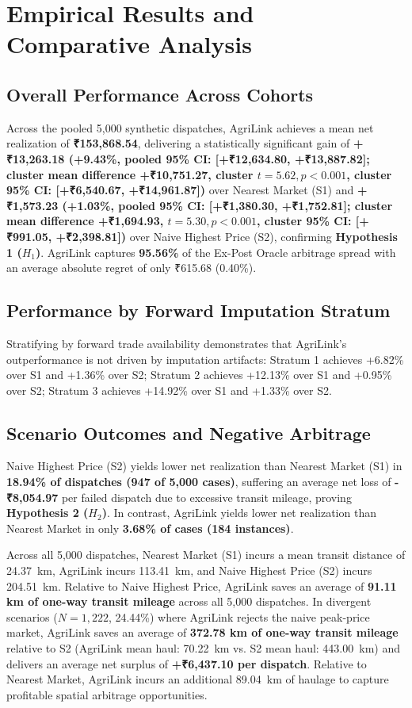 \documentclass[journal]{IEEEtran}
\begin{document}
\section{Empirical Results and Comparative Analysis}
\subsection{Overall Performance Across Cohorts}
Across the pooled 5,000 synthetic dispatches, AgriLink achieves a mean net realization of \textbf{₹153,868.54}, delivering a statistically significant gain of \textbf{+₹13,263.18 (+9.43\%, pooled 95\% CI: [+₹12,634.80, +₹13,887.82]; cluster mean difference +₹10,751.27, cluster $t = 5.62, p < 0.001$, cluster 95\% CI: [+₹6,540.67, +₹14,961.87])} over Nearest Market (S1) and \textbf{+₹1,573.23 (+1.03\%, pooled 95\% CI: [+₹1,380.30, +₹1,752.81]; cluster mean difference +₹1,694.93, $t = 5.30, p < 0.001$, cluster 95\% CI: [+₹991.05, +₹2,398.81])} over Naive Highest Price (S2), confirming \textbf{Hypothesis 1 ($H_1$)}. AgriLink captures \textbf{95.56\%} of the Ex-Post Oracle arbitrage spread with an average absolute regret of only ₹615.68 (0.40\%).

\subsection{Performance by Forward Imputation Stratum}
Stratifying by forward trade availability demonstrates that AgriLink's outperformance is not driven by imputation artifacts: Stratum 1 achieves +6.82\% over S1 and +1.36\% over S2; Stratum 2 achieves +12.13\% over S1 and +0.95\% over S2; Stratum 3 achieves +14.92\% over S1 and +1.33\% over S2.

\subsection{Scenario Outcomes and Negative Arbitrage}
Naive Highest Price (S2) yields lower net realization than Nearest Market (S1) in \textbf{18.94\% of dispatches (947 of 5,000 cases)}, suffering an average net loss of \textbf{-₹8,054.97} per failed dispatch due to excessive transit mileage, proving \textbf{Hypothesis 2 ($H_2$)}. In contrast, AgriLink yields lower net realization than Nearest Market in only \textbf{3.68\% of cases (184 instances)}.

Across all 5,000 dispatches, Nearest Market (S1) incurs a mean transit distance of 24.37~km, AgriLink incurs 113.41~km, and Naive Highest Price (S2) incurs 204.51~km. Relative to Naive Highest Price, AgriLink saves an average of \textbf{91.11 km of one-way transit mileage} across all 5,000 dispatches. In divergent scenarios ($N = 1,222$, 24.44\%) where AgriLink rejects the naive peak-price market, AgriLink saves an average of \textbf{372.78 km of one-way transit mileage} relative to S2 (AgriLink mean haul: 70.22~km vs. S2 mean haul: 443.00~km) and delivers an average net surplus of \textbf{+₹6,437.10 per dispatch}. Relative to Nearest Market, AgriLink incurs an additional 89.04~km of haulage to capture profitable spatial arbitrage opportunities.
\end{document}
